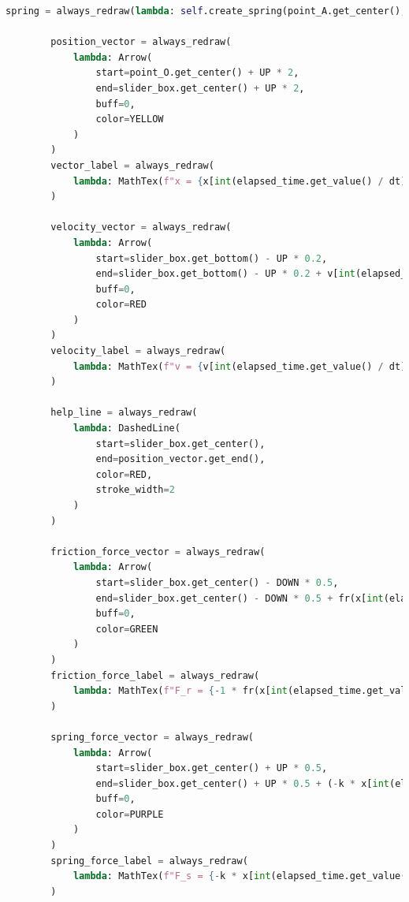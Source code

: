 \documentclass[12pt, a4paper, oneside]{report}
\begin{document}
\begin{lstlisting}[language=Python, caption=Manim Simulation Code]
        spring = always_redraw(lambda: self.create_spring(point_A.get_center(), slider_box.get_center()))

        position_vector = always_redraw(
            lambda: Arrow(
                start=point_O.get_center() + UP * 2,
                end=slider_box.get_center() + UP * 2,
                buff=0,
                color=YELLOW
            )
        )
        vector_label = always_redraw(
            lambda: MathTex(f"x = {x[int(elapsed_time.get_value() / dt)]:.4f} m").next_to(position_vector.get_end(), UP)
        )

        velocity_vector = always_redraw(
            lambda: Arrow(
                start=slider_box.get_bottom() - UP * 0.2,
                end=slider_box.get_bottom() - UP * 0.2 + v[int(elapsed_time.get_value() / dt)] * RIGHT * 0.1,
                buff=0,
                color=RED
            )
        )
        velocity_label = always_redraw(
            lambda: MathTex(f"v = {v[int(elapsed_time.get_value() / dt)]:.4f} m/s").next_to(velocity_vector.get_end(), DOWN)
        )

        help_line = always_redraw(
            lambda: DashedLine(
                start=slider_box.get_center(),
                end=position_vector.get_end(),
                color=RED,
                stroke_width=2
            )
        )

        friction_force_vector = always_redraw(
            lambda: Arrow(
                start=slider_box.get_center() - DOWN * 0.5,
                end=slider_box.get_center() - DOWN * 0.5 + fr(x[int(elapsed_time.get_value() / dt)], v[int(elapsed_time.get_value() / dt)], m, g, k, mu_s, mu_d) * LEFT * 0.01,
                buff=0,
                color=GREEN
            )
        )
        friction_force_label = always_redraw(
            lambda: MathTex(f"F_r = {-1 * fr(x[int(elapsed_time.get_value() / dt)], v[int(elapsed_time.get_value() / dt)], m, g, k, mu_s, mu_d):.4f} N").next_to(friction_force_vector.get_end(), DOWN + RIGHT)
        )

        spring_force_vector = always_redraw(
            lambda: Arrow(
                start=slider_box.get_center() + UP * 0.5,
                end=slider_box.get_center() + UP * 0.5 + (-k * x[int(elapsed_time.get_value() / dt)]) * RIGHT * 0.01,
                buff=0,
                color=PURPLE
            )
        )
        spring_force_label = always_redraw(
            lambda: MathTex(f"F_s = {-k * x[int(elapsed_time.get_value() / dt)]:.4f} N").next_to(spring_force_vector.get_end(), UP)
        )


\end{lstlisting}
\end{document}
